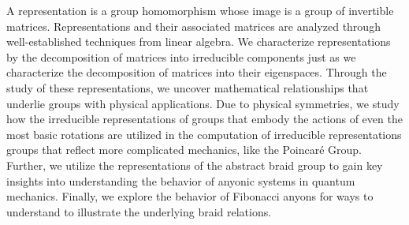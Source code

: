 A representation is a group homomorphism whose image is a group of invertible matrices. Representations and their associated matrices are analyzed through well-established techniques from linear algebra. We characterize representations by the decomposition of matrices into irreducible components just as we characterize the decomposition of matrices into their eigenspaces. Through the study of these representations, we uncover mathematical relationships that underlie groups with physical applications. Due to physical symmetries, we study how the irreducible representations of groups that embody the actions of even the most basic rotations are utilized in the computation of irreducible representations groups that reflect more complicated mechanics, like the Poincar\'e Group. Further, we utilize the representations of the abstract braid group to gain key insights into understanding the behavior of anyonic systems in quantum mechanics. Finally, we explore the behavior of Fibonacci anyons for ways to understand to illustrate the underlying braid relations.

